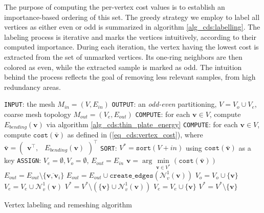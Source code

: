 \documentclass[graybox]{svmult}
\begin{document}
	The purpose of computing the per-vertex cost values is to establish an importance-based ordering of this set. The greedy strategy we employ to label all vertices as either even or odd is summarized in algorithm \ref{alg_cds:labelling}. The labeling process is iterative and marks the vertices intuitively, according to their computed importance. During each iteration, the vertex having the lowest cost is extracted from the set of unmarked vertices. Its one-ring neighbors are then colored as even, while the extracted sample is marked as odd. The intuition behind the process reflects the goal of removing less relevant samples, from high redundancy areas.
	\begin{algorithm}[t]
		\begin{algorithmic}
			\STATE \texttt{INPUT}: the mesh $M_{in}=(V,E_{in})$
			\STATE \texttt{OUTPUT}: an \emph{odd-even} partitioning, $V = {V_o} \cup {V_e}$, coarse mesh topology ${M}_{out}=(V_e,{E}_{out})$
			\STATE \texttt{COMPUTE}: for each $\mathbf{v} \in V$, compute $E_{bending}(\mathbf{v})$ via algorithm \ref{alg_cds:thin_plate_energy} 
			\STATE \texttt{COMPUTE}: for each $\mathbf{v} \in V$, compute $\mathtt{cost}(\mathbf{\bar{v}})$ as defined in (\ref{eq_cds:vertex_cost}), where $\mathbf{\bar{v}} = \begin{pmatrix}\mathbf{v}^\intercal, & E_{bending}(\mathbf{v})\end{pmatrix}^\intercal$
			\STATE \texttt{SORT}: $V^{*} = \mathtt{sort}(V+{in})$ using $\mathtt{cost}(\mathbf{\bar{v}})$ as a key
			\STATE \texttt{ASSIGN}: $V_e = \emptyset, V_o = \emptyset$, ${E}_{out} = E_{in}$
			\STATE $\mathbf{v} = \arg\min\limits_{\mathbf{v} \in V^{*}}(\mathtt{cost}(\mathbf{\bar{v}}))$
			\STATE ${E}_{out} = {E}_{out} \setminus \{\overline{\mathbf{v}, \mathbf{v}_i}\}$
			\ENDFOR
			\STATE ${E}_{out} = {E}_{out} \cup \mathtt{create\_edges}(\mathcal{N}_v^1(\mathbf{v}))$
			\STATE $V_o = V_o \cup \{\mathbf{v}\}$
			\STATE $V_e = V_e \cup \mathcal{N}_v^1(\mathbf{v})$
			\STATE $V^{*} = V^{*} \setminus \left( \{ \mathbf{v} \} \cup \mathcal{N}_v^1(\mathbf{v}) \right)$
			\ELSE
			\STATE $V_e = V_e \cup \{\mathbf{v}\}$
			\STATE $V^{*} = V^{*} \setminus \{ \mathbf{v} \}$
			\ENDIF
			\ENDWHILE
		\end{algorithmic}
		\caption{Vertex labeling and remeshing algorithm}
		\label{alg_cds:labelling}
	\end{algorithm}
	
\end{document}
